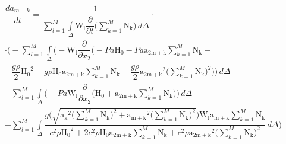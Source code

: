 \documentclass[14pt]{extreport}
\begin{document}
\begin{multline*}
\dfrac{da_{m+k}}{dt}=\dfrac{1}{\sum\limits_{l=1}^{M} \int\limits_{\Delta} \operatorname{W_{l}} \dfrac{\partial}{\partial t}\bigg(\sum\limits_{k=1}^{M} \operatorname{N_{k}}\bigg)\, d\Delta}\cdot \\ \cdot \bigg(- \sum_{l=1}^{M} \int\limits_{\Delta} \bigg(- \operatorname{W_{l}} \dfrac{\partial}{\partial x_{2}}\bigg(- Pa \operatorname{H_{0}} - Pa \operatorname{a_{2m+k}} \sum_{k=1}^{M} \operatorname{N_{k}} -\\- \dfrac{g \rho}{2} \operatorname{H_{0}}^{2} - g \rho \operatorname{H_{0}} \operatorname{a_{2m+k}} \sum_{k=1}^{M} \operatorname{N_{k}} - \dfrac{g \rho}{2} \operatorname{a_{2m+k}}^{2} \bigg(\sum_{k=1}^{M} \operatorname{N_{k}}\bigg)^{2}\bigg)\bigg)\, d\Delta -\\- \sum_{l=1}^{M} \int\limits_{\Delta} \bigg(- Pa \operatorname{W_{l}} \dfrac{\partial}{\partial x_{2}}\bigg(\operatorname{H_{0}} + \operatorname{a_{2m+k}} \sum_{k=1}^{M} \operatorname{N_{k}}\bigg)\bigg)\, d\Delta -\\ - \sum_{l=1}^{M} \int\limits_{\Delta} \dfrac{g \bigg(\sqrt{\operatorname{a_{k}}^{2} \bigg(\sum\limits_{k=1}^{M} \operatorname{N_{k}}\bigg)^{2} + \operatorname{a_{m+k}}^{2} \bigg(\sum\limits_{k=1}^{M} \operatorname{N_{k}}\bigg)^{2}}\bigg) \operatorname{W_{l}} \operatorname{a_{m+k}} \sum\limits_{k=1}^{M} \operatorname{N_{k}}}{c^{2} \rho \operatorname{H_{0}}^{2} + 2 c^{2} \rho \operatorname{H_{0}} \operatorname{a_{2m+k}} \sum\limits_{k=1}^{M} \operatorname{N_{k}} + c^{2} \rho \operatorname{a_{2m+k}}^{2} \bigg(\sum\limits_{k=1}^{M} \operatorname{N_{k}}\bigg)^{2}}\, d\Delta\bigg)
\end{multline*}
\end{document}
